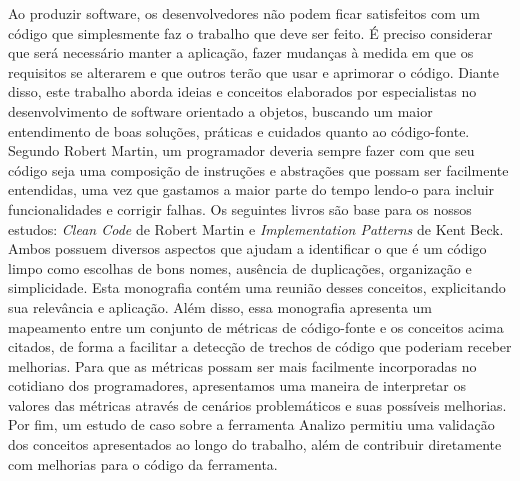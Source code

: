 \documentclass[11pt,a4paper]{book}
\begin{document}
Ao produzir software, os desenvolvedores não podem ficar satisfeitos com um código que simplesmente faz o trabalho que deve ser feito. É preciso 
considerar que será necessário manter a aplicação, fazer mudanças à medida em que os requisitos se alterarem e que outros terão que usar e aprimorar o 
código.
%
Diante disso, este trabalho aborda ideias e conceitos elaborados por especialistas no desenvolvimento de software
orientado a objetos, buscando um maior entendimento de boas soluções, práticas e cuidados quanto ao código-fonte.
Segundo Robert Martin, um programador deveria sempre fazer com que seu código seja uma composição de instruções e
abstrações que possam ser facilmente entendidas, uma vez que gastamos a maior parte do tempo lendo-o para incluir
funcionalidades e corrigir falhas.
%
Os seguintes livros são base para os nossos estudos: \textit{Clean Code} de Robert Martin e \textit{Implementation Patterns} de Kent Beck.
Ambos possuem diversos aspectos que ajudam a identificar o que é um código limpo como escolhas de bons nomes, ausência de
duplicações, organização e simplicidade. Esta monografia contém uma reunião desses conceitos, explicitando sua relevância e aplicação.
%
Além disso, essa monografia apresenta um mapeamento entre um conjunto de métricas de código-fonte e os conceitos acima citados,
de forma a facilitar a detecção de trechos de código que poderiam receber melhorias. Para que as métricas possam ser mais 
facilmente incorporadas no cotidiano dos programadores, apresentamos uma maneira de interpretar os valores das métricas através de cenários
problemáticos e suas possíveis melhorias.
%
Por fim, um estudo de caso sobre a ferramenta Analizo permitiu uma validação dos conceitos apresentados ao longo
do trabalho, além de contribuir diretamente com melhorias para o código da ferramenta.

\mainmatter

\tableofcontents

\fancyhead[RE,LO]{\thesection}

\onehalfspacing            %










\backmatter \singlespacing
 
\end{document}

